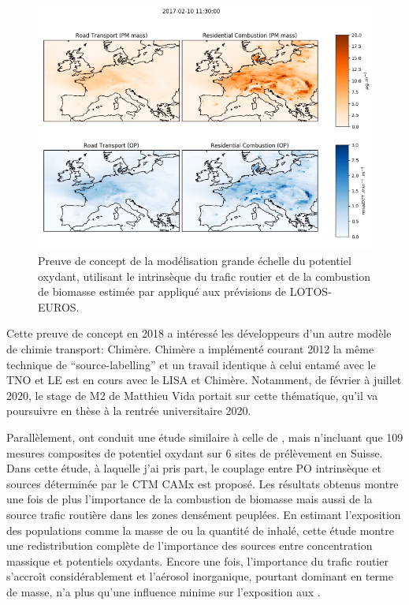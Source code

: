 \begin{figure}[ht]
    \centering
    \includegraphics[width=0.8\linewidth]{figures/chapter05/OPmap.png}
    \caption{Preuve de concept de la modélisation grande échelle du potentiel oxydant,
    utilisant le \PODTT{} intrinsèque du trafic routier et de la combustion de biomasse
estimée par \cite{weberSourceinprep.} appliqué aux prévisions de LOTOS-EUROS.}%
    \label{fig:OPmap}
\end{figure}

Cette preuve de concept en 2018 a intéressé les développeurs
d'un autre modèle de chimie transport: Chimère. Chimère a implémenté courant 2012 la
même technique de ``source-labelling'' et un travail identique à celui entamé avec le TNO
et LE est en cours avec le LISA et Chimère. Notamment, de février à juillet 2020, le
stage de M2 de Matthieu Vida portait sur cette thématique, qu'il va poursuivre en thèse à
la rentrée universitaire 2020.

Parallèlement, \cite{daellenbachSourcessubmitted} ont conduit une étude similaire à celle
de \cite{weberSourceinprep.}, mais n'incluant que 109 mesures composites de potentiel
oxydant sur 6 sites de prélèvement en Suisse. Dans cette étude, à laquelle j'ai pris
part, le couplage entre PO intrinsèque et sources déterminée par le CTM CAMx est proposé.
Les résultats obtenus montre une fois de plus
l'importance de la combustion de biomasse mais aussi de la source trafic routière dans
les zones densément peuplées. En estimant l'exposition des populations comme la masse de
\PMdix{} ou la quantité de \POv{} inhalé, cette étude montre une
redistribution complète de l'importance des sources entre concentration massique et
potentiels oxydants. Encore une fois, l'importance du trafic routier s'accroît
considérablement et l'aérosol inorganique, pourtant dominant en terme de masse, n'a plus
qu'une influence minime sur l'exposition aux \POv.

